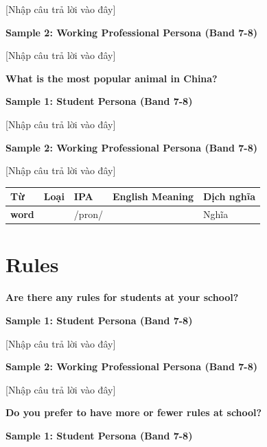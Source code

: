 [Nhập câu trả lời vào đây]

\textbf{Sample 2: Working Professional Persona (Band 7-8)}

[Nhập câu trả lời vào đây]

\separator

\begin{ieltsquestion}
\textbf{What is the most popular animal in China?}
\end{ieltsquestion}
\textbf{Sample 1: Student Persona (Band 7-8)}

[Nhập câu trả lời vào đây]

\textbf{Sample 2: Working Professional Persona (Band 7-8)}

[Nhập câu trả lời vào đây]

\separator


\vspace{0.8em}
\begin{center}
\renewcommand{\arraystretch}{1.65}
\begin{tabularx}{\textwidth}{|V{0.22\textwidth}|C{0.07\textwidth}|I{0.20\textwidth}|Y|V{0.18\textwidth}|}
\hline
{}
\textbf{Từ} & \textbf{Loại} & \textbf{IPA} & \textbf{English Meaning} & \textbf{Dịch nghĩa} \\
\hline
\textbf{word} &  & /pron/ &  & Nghĩa \\ \hline
\end{tabularx}
\end{center}

\newpage

\section{Rules}
\begin{ieltsquestion}
\textbf{Are there any rules for students at your school?}
\end{ieltsquestion}
\textbf{Sample 1: Student Persona (Band 7-8)}

[Nhập câu trả lời vào đây]

\textbf{Sample 2: Working Professional Persona (Band 7-8)}

[Nhập câu trả lời vào đây]

\separator

\begin{ieltsquestion}
\textbf{Do you prefer to have more or fewer rules at school?}
\end{ieltsquestion}
\textbf{Sample 1: Student Persona (Band 7-8)}

